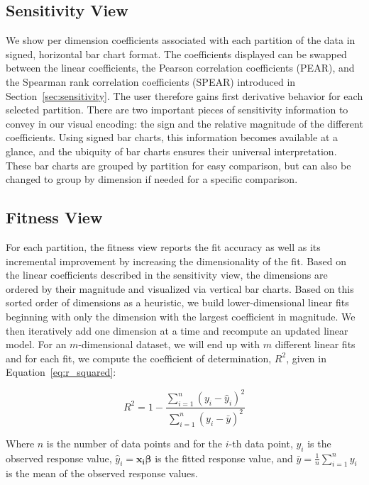 \subsection{Sensitivity View}
\label{sec:sensitivityView}
We show per dimension coefficients associated with each partition of the data in signed, horizontal bar chart format.
%
The coefficients displayed can be swapped between the linear coefficients, the Pearson correlation coefficients (PEAR), and the Spearman rank correlation coefficients (SPEAR) introduced in Section~\ref{sec:sensitivity}.
%
The user therefore gains first derivative behavior for each selected partition.
%
There are two important pieces of sensitivity information to convey in our visual encoding: the sign and the relative magnitude of the different coefficients.
%
Using signed bar charts, this information becomes available at a glance, and the ubiquity of bar charts ensures their universal interpretation.
%
These bar charts are grouped by partition for easy comparison, but can also be changed to group by dimension if needed for a specific comparison.

\subsection{Fitness View}
\label{sec:fitnessView}
For each partition, the fitness view reports the fit accuracy as well as its incremental improvement by increasing the dimensionality of the fit.
%
Based on the linear coefficients described in the sensitivity view, the dimensions are ordered by their magnitude and visualized via vertical bar charts.
%
Based on this sorted order of dimensions as a heuristic, we build lower-dimensional linear fits beginning with only the dimension with the largest coefficient in magnitude.
%
We then iteratively add one dimension at a time and recompute an updated linear model.
%
For an $m$-dimensional dataset, we will end up with $m$ different linear fits and for each fit, we compute the coefficient of determination, $R^2$, given in Equation~\ref{eq:r_squared}:

\begin{equation}
    R^2 = 1 - \frac{\sum_{i=1}^n ( y_i - \hat{y}_i)^2}{\sum_{i=1}^n ( y_i - \bar{y})^2}
    \label{eq:r_squared}
\end{equation}

Where $n$ is the number of data points and for the $i$-th data point, $y_i$ is the observed response value, $\hat{y}_i = \mathbf{x_{i}}\boldsymbol\beta$ is the fitted response value, and $\bar{y} = \frac{1}{n}\sum_{i=1}^{n}y_i$ is the mean of the observed response values.

